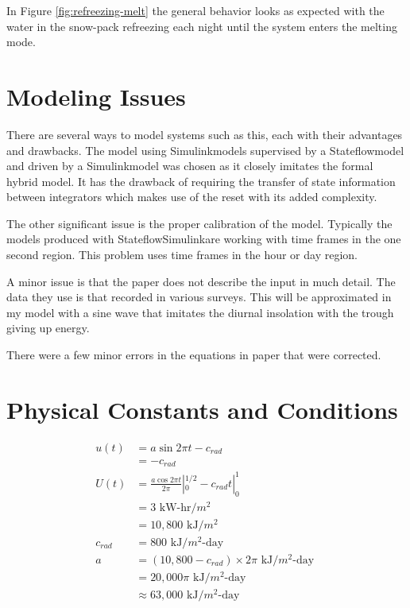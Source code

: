 \documentclass{article}
\begin{document}
In Figure \ref{fig:refreezing-melt} the general behavior looks as expected
with the water in the snow-pack refreezing each night until
the system enters the melting mode.


\section{Modeling Issues}

There are several ways to model systems such as this,
each with their advantages and drawbacks.
The model using Simulink\textregistered models supervised
by a Stateflow\textregistered model and driven by a 
Simulink\textregistered model was chosen as it 
closely imitates the formal hybrid model.
It has the drawback of requiring the transfer of
state information between integrators which makes use
of the reset with its added complexity.

The other significant issue is the proper calibration of the model.
Typically the models produced with 
Stateflow\textregistered Simulink\textregistered are working
with time frames in the one second region.
This problem uses time frames in the hour or day region.

A minor issue is that the paper does not describe
the input in much detail.
The data they use is that recorded in various surveys.
This will be approximated in my model with a sine wave
that imitates the diurnal insolation with the trough
giving up energy.

There were a few minor errors in the equations in
paper that were corrected.


\section{Physical Constants and Conditions}

\begin{align} 
u(t) &= a \sin{2 \pi t} - c_{rad} \\
 &= - c_{rad} \\
U(t) &= \frac{a \cos{2 \pi t}}{2 \pi} |_0^{1/2} - c_{rad} t |_0^1 \\ 
  &= 3 \text{ kW-hr/$m^2$ } \\
  &= 10,800 \text{ kJ/$m^2$ } \\
c_{rad} &= 800 \text{ kJ/$m^2$-day } \\
a &= (10,800 - c_{rad}) \times 2 \pi \text{ kJ/$m^2$-day } \\
 &= 20,000 \pi \text{ kJ/$m^2$-day } \\
 &\approx 63,000 \text{ kJ/$m^2$-day }
\end{align}
\end{document}
